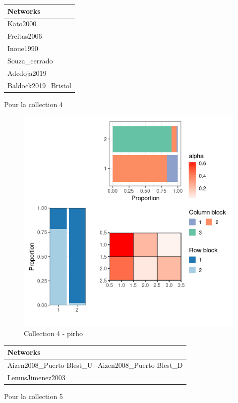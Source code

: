 \begin{longtable}[]{@{}l@{}}
\toprule
Networks\tabularnewline
\midrule
\endhead
Kato2000\tabularnewline
Freitas2006\tabularnewline
Inoue1990\tabularnewline
Souza\_cerrado\tabularnewline
Adedoja2019\tabularnewline
Baldock2019\_Bristol\tabularnewline
\bottomrule
\end{longtable}

Pour la collection 4

\begin{figure}
\centering
\includegraphics{figure/pirho_meso_plot-4.png}
\caption{Collection 4 - pirho}
\end{figure}

\begin{longtable}[]{@{}l@{}}
\toprule
Networks\tabularnewline
\midrule
\endhead
Aizen2008\_Puerto Blest\_U+Aizen2008\_Puerto Blest\_D\tabularnewline
LemusJimenez2003\tabularnewline
\bottomrule
\end{longtable}

Pour la collection 5

